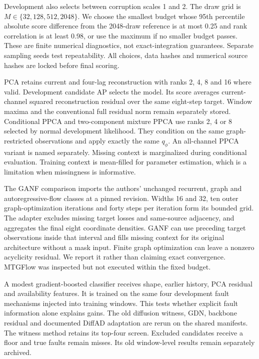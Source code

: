 \documentclass[conference]{IEEEtran}
\newcommand{\1}{\mathbf{1}}
\begin{document}
Development also selects between corruption scales 1 and 2. The draw grid is $M\in\{32,128,512,2048\}$. We choose the smallest budget whose 95th percentile absolute score difference from the 2048-draw reference is at most 0.25 and rank correlation is at least 0.98, or use the maximum if no smaller budget passes. These are finite numerical diagnostics, not exact-integration guarantees. Separate sampling seeds test repeatability. All choices, data hashes and numerical source hashes are locked before final scoring.

PCA retains current and four-lag reconstruction with ranks 2, 4, 8 and 16 where valid. Development candidate AP selects the model. Its score averages current-channel squared reconstruction residual over the same eight-step target. Window maxima and the conventional full residual norm remain separately stored. Conditional PPCA and two-component mixture PPCA use ranks 2, 4 or 8 selected by normal development likelihood. They condition on the same graph-restricted observations and apply exactly the same $q_\phi$. An all-channel PPCA variant is named separately. Missing context is marginalized during conditional evaluation. Training context is mean-filled for parameter estimation, which is a limitation when missingness is informative.

The GANF comparison imports the authors' unchanged recurrent, graph and autoregressive-flow classes at a pinned revision. Widths 16 and 32, ten outer graph-optimization iterations and forty steps per iteration form its bounded grid. The adapter excludes missing target losses and same-source adjacency, and aggregates the final eight coordinate densities. GANF can use preceding target observations inside that interval and fills missing context for its original architecture without a mask input. Finite graph optimization can leave a nonzero acyclicity residual. We report it rather than claiming exact convergence. MTGFlow was inspected but not executed within the fixed budget.

A modest gradient-boosted classifier receives shape, earlier history, PCA residual and availability features. It is trained on the same four development fault mechanisms injected into training windows. This tests whether explicit fault information alone explains gains. The old diffusion witness, GDN, backbone residual and documented DiffAD adaptation are rerun on the shared manifests. The witness method retains its top-four screen. Excluded candidates receive a floor and true faults remain misses. Its old window-level results remain separately archived.
\end{document}
